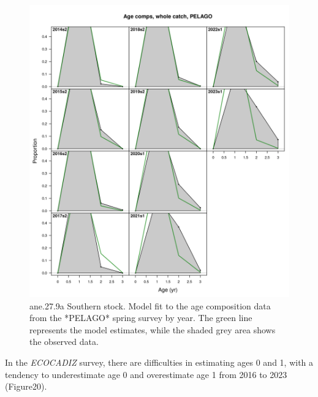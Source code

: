 \documentclass[
]{article}
\begin{document}
\begin{figure}[H]

{\centering \includegraphics[width=0.95\linewidth]{report/run/S1.0_4FLEETS_SelECO_RecIndex_Mnewfix/fig_age_fit_Pelago} 

}

\caption{ane.27.9a Southern stock. Model fit to the age composition data from the *PELAGO* spring survey by year. The green line represents the model estimates, while the shaded grey area shows the observed data.}\label{fig:unnamed-chunk-23}
\end{figure}

In the \emph{ECOCADIZ} survey, there are difficulties in estimating ages
0 and 1, with a tendency to underestimate age 0 and overestimate age 1
from 2016 to 2023 (Figure20).
\end{document}

